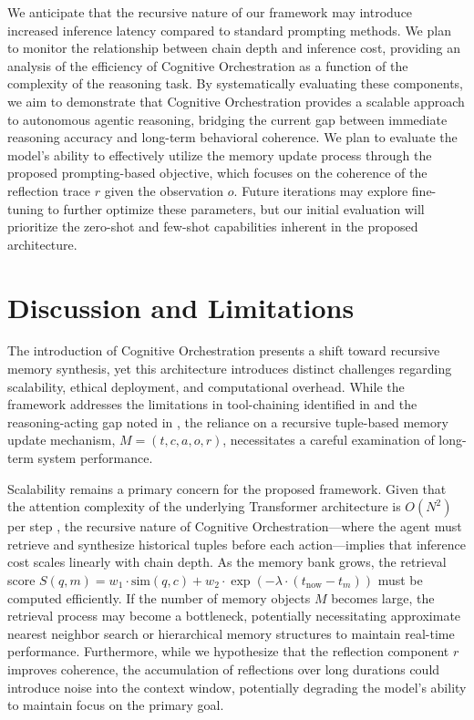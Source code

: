 \documentclass[11pt,a4paper]{article}
\begin{document}
We anticipate that the recursive nature of our framework may introduce increased inference latency compared to standard prompting methods. We plan to monitor the relationship between chain depth and inference cost, providing an analysis of the efficiency of Cognitive Orchestration as a function of the complexity of the reasoning task. By systematically evaluating these components, we aim to demonstrate that Cognitive Orchestration provides a scalable approach to autonomous agentic reasoning, bridging the current gap between immediate reasoning accuracy and long-term behavioral coherence. We plan to evaluate the model's ability to effectively utilize the memory update process through the proposed prompting-based objective, which focuses on the coherence of the reflection trace $r$ given the observation $o$. Future iterations may explore fine-tuning to further optimize these parameters, but our initial evaluation will prioritize the zero-shot and few-shot capabilities inherent in the proposed architecture.

\section{Discussion and Limitations}
The introduction of Cognitive Orchestration presents a shift toward recursive memory synthesis, yet this architecture introduces distinct challenges regarding scalability, ethical deployment, and computational overhead. While the framework addresses the limitations in tool-chaining identified in \cite{schick2023} and the reasoning-acting gap noted in \cite{yao2023}, the reliance on a recursive tuple-based memory update mechanism, $M = (t, c, a, o, r)$, necessitates a careful examination of long-term system performance.

Scalability remains a primary concern for the proposed framework. Given that the attention complexity of the underlying Transformer architecture is $O(N^2)$ per step \cite{vaswani2017}, the recursive nature of Cognitive Orchestration---where the agent must retrieve and synthesize historical tuples before each action---implies that inference cost scales linearly with chain depth. As the memory bank grows, the retrieval score $S(q, m) = w_1 \cdot \text{sim}(q, c) + w_2 \cdot \exp(-\lambda \cdot (t_{\text{now}} - t_m))$ must be computed efficiently. If the number of memory objects $M$ becomes large, the retrieval process may become a bottleneck, potentially necessitating approximate nearest neighbor search or hierarchical memory structures to maintain real-time performance. Furthermore, while we hypothesize that the reflection component $r$ improves coherence, the accumulation of reflections over long durations could introduce noise into the context window, potentially degrading the model's ability to maintain focus on the primary goal.
\end{document}
